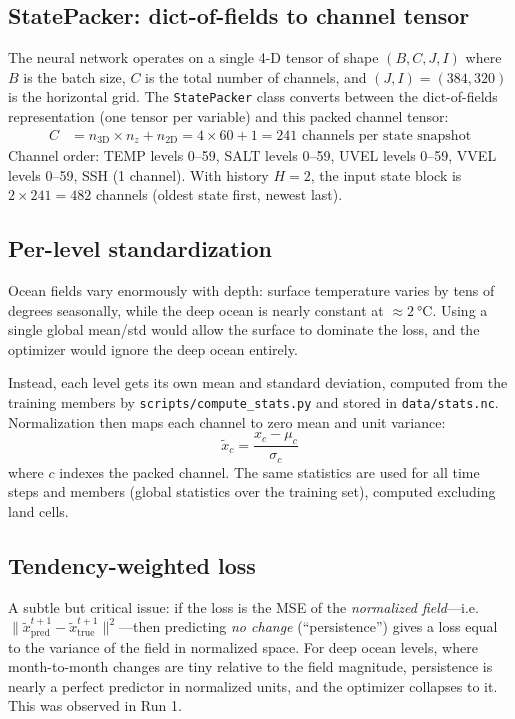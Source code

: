 \documentclass[11pt]{article}
\begin{document}
\subsection{StatePacker: dict-of-fields to channel tensor}
The neural network operates on a single 4-D tensor of shape
$(B, C, J, I)$ where $B$ is the batch size, $C$ is the total number of
channels, and $(J, I) = (384, 320)$ is the horizontal grid. The
\texttt{StatePacker} class converts between the dict-of-fields representation
(one tensor per variable) and this packed channel tensor:
\begin{align}
C &= n_\text{3D} \times n_z + n_\text{2D}
   = 4\times60 + 1 = 241\text{ channels per state snapshot}
\end{align}
Channel order: TEMP levels 0--59, SALT levels 0--59, UVEL levels 0--59,
VVEL levels 0--59, SSH (1 channel). With history $H=2$, the input state
block is $2\times241 = 482$ channels (oldest state first, newest last).

\subsection{Per-level standardization}
Ocean fields vary enormously with depth: surface temperature varies by tens of
degrees seasonally, while the deep ocean is nearly constant at
$\approx\SI{2}{\degreeCelsius}$. Using a single global mean/std would allow
the surface to dominate the loss, and the optimizer would ignore the deep ocean
entirely.

Instead, each level gets its own mean and standard deviation, computed from the
training members by \texttt{scripts/compute\_stats.py} and stored in
\texttt{data/stats.nc}. Normalization then maps each channel to zero mean and
unit variance:
\begin{equation}
\tilde{x}_c = \frac{x_c - \mu_c}{\sigma_c}
\end{equation}
where $c$ indexes the packed channel. The same statistics are used for all
time steps and members (global statistics over the training set), computed
excluding land cells.

\subsection{Tendency-weighted loss}
\label{sec:twloss}
A subtle but critical issue: if the loss is the MSE of the \emph{normalized
field}---i.e.\ $\|\tilde{x}^{t+1}_\text{pred} - \tilde{x}^{t+1}_\text{true}\|^2$---then
predicting \emph{no change} (``persistence'') gives a loss equal to the
variance of the field in normalized space. For deep ocean levels, where
month-to-month changes are tiny relative to the field magnitude, persistence
is nearly a perfect predictor in normalized units, and the optimizer collapses
to it. This was observed in Run 1.
\end{document}
